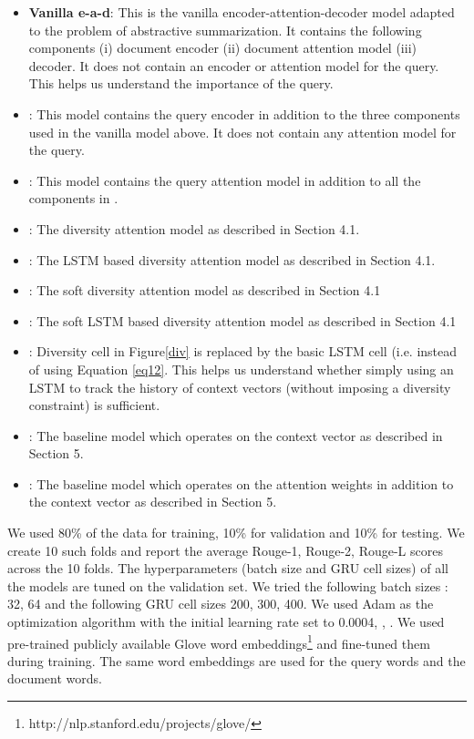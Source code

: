 \documentclass[11pt]{article}
\begin{document}
\begin{itemize}
\item \textbf{Vanilla e-a-d}: This is the vanilla encoder-attention-decoder model adapted to the problem of abstractive summarization. It contains the following components (i) document encoder (ii) document attention model (iii) decoder. It does not contain an encoder or attention model for the query. This helps us understand the importance of the query.
\vspace{-0.05in}
\item \textbf{}: This model contains the query encoder in addition to the three components used in the vanilla model above. It does not contain any attention model for the query.
\vspace{-0.05in}
\item \textbf{}: This model contains the query attention model in addition to all the components in .
\vspace{-0.05in}
\item \textbf{}: The diversity attention model as described in Section 4.1.
\vspace{-0.05in}
\item \textbf{}: The LSTM based diversity attention model as described in Section 4.1.
\vspace{-0.05in}
\item \textbf{}: The soft diversity attention model as described in Section 4.1
\vspace{-0.05in}
\item \textbf {}: The soft LSTM based diversity attention model as described in Section 4.1
\vspace{-0.05in}
\item \textbf {}: Diversity cell in Figure\ref{div} is replaced by the basic LSTM cell (i.e.  instead of using Equation \eqref{eq12}. This helps us understand whether simply using an LSTM to track the history of context vectors (without imposing a diversity constraint) is sufficient.
\vspace{-0.05in}
\item \textbf{}: The baseline model which operates on the context vector as described in Section 5.
\item \textbf{}: The baseline model which operates on the attention weights in addition to the context vector as described in Section 5.
\end{itemize}

We used 80\% of the data for training, 10\% for validation and 10\% for testing. We create 10 such folds and report the average Rouge-1, Rouge-2, Rouge-L scores across the 10 folds. The hyperparameters (batch size and GRU cell sizes) of all the models are tuned on the validation set. We tried the following batch sizes : {32, 64} and the following GRU cell sizes {200, 300, 400}. We used Adam \cite{kingma2014adam} as the optimization algorithm with the initial learning rate set to 0.0004, , . We used pre-trained publicly available Glove word embeddings\footnote{http://nlp.stanford.edu/projects/glove/} and fine-tuned them during training. The same word embeddings are used for the query words and the document words.
\end{document}
